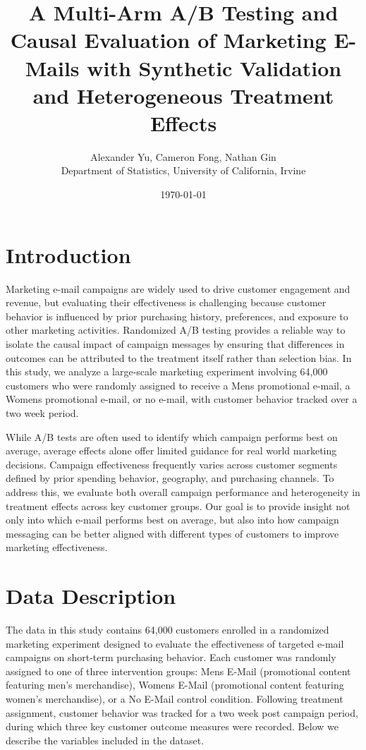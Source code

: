 \documentclass[10pt]{article}
\title{A Multi-Arm A/B Testing and Causal Evaluation of Marketing E-Mails with Synthetic Validation and Heterogeneous Treatment Effects}
\author{Alexander Yu, Cameron Fong, Nathan Gin \\
Department of Statistics, University of California, Irvine}
\date{\today}
\begin{document}
\maketitle
\newpage
\tableofcontents
\newpage


\section{Introduction}

Marketing e-mail campaigns are widely used to drive customer engagement and revenue, but evaluating their effectiveness is challenging because customer behavior is influenced by prior purchasing history, preferences, and exposure to other marketing activities. Randomized A/B testing provides a reliable way to isolate the causal impact of campaign messages by ensuring that differences in outcomes can be attributed to the treatment itself rather than selection bias. In this study, we analyze a large-scale marketing experiment involving 64,000 customers who were randomly assigned to receive a Mens promotional e-mail, a Womens promotional e-mail, or no e-mail, with customer behavior tracked over a two week period.

While A/B tests are often used to identify which campaign performs best on average, average effects alone offer limited guidance for real world marketing decisions. Campaign effectiveness frequently varies across customer segments defined by prior spending behavior, geography, and purchasing channels. To address this, we evaluate both overall campaign performance and heterogeneity in treatment effects across key customer groups. Our goal is to provide insight not only into which e-mail performs best on average, but also into how campaign messaging can be better aligned with different types of customers to improve marketing effectiveness.

\section{Data Description}
The data in this study contains 64,000 customers enrolled in a randomized marketing experiment designed to evaluate the effectiveness of targeted e-mail campaigns on short-term purchasing behavior. Each customer was randomly assigned to one of three intervention groups: Mens E-Mail (promotional content featuring men’s merchandise), Womens E-Mail (promotional content featuring women’s merchandise), or a No E-Mail control condition. Following treatment assignment, customer behavior was tracked for a two week post campaign period, during which three key customer outcome measures were recorded. Below we describe the variables included in the dataset.
\end{document}
